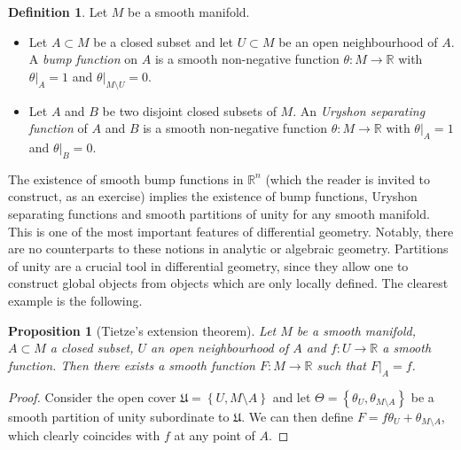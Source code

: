 \documentclass[11pt,a4paper]{book}
\newtheorem{prop}[thm]{Proposition}
\theoremstyle{remark} \newtheorem{rmk}[thm]{Remark}
\theoremstyle{definition} \newtheorem{defn}[thm]{Definition}
\theoremstyle{definition} \newtheorem{ex}[thm]{Example}
\theoremstyle{definition} \newtheorem{ej}[thm]{Exercise}
\begin{document}
\begin{defn}
  Let $M$ be a smooth manifold.
  \begin{itemize}
    \item Let $A\subset M$ be a closed subset and let $U\subset M$ be an open neighbourhood of $A$. A \emph{bump function} on $A$ is a smooth non-negative function $\theta:M\rightarrow \mathbb{R}$ with $\theta|_A = 1$ and $\theta|_{M\setminus U} = 0$.
          \item Let $A$ and $B$ be two disjoint closed subsets of $M$. An \emph{Uryshon separating function} of $A$ and $B$ is a smooth non-negative function $\theta:M\rightarrow \mathbb{R}$ with $\theta|_A=1$ and $\theta|_B = 0$.
  \end{itemize}
\end{defn}

The existence of smooth bump functions in $\mathbb{R}^n$ (which the reader is invited to construct, as an exercise) implies the existence of bump functions, Uryshon separating functions and smooth partitions of unity for any smooth manifold. This is one of the most important features of differential geometry. Notably, there are no counterparts to these notions in analytic or algebraic geometry. Partitions of unity are a crucial tool in differential geometry, since they allow one to construct global objects from objects which are only locally defined. The clearest example is the following.

\begin{prop}[Tietze's extension theorem]
Let $M$ be a smooth manifold, $A\subset M$ a closed subset, $U$ an open neighbourhood of $A$ and $f:U\rightarrow \mathbb{R}$ a smooth function. Then there exists a smooth function $F:M\rightarrow \mathbb{R}$ such that $F|_A = f$.
\end{prop}

\begin{proof}
Consider the open cover $\mathfrak{U}=\left\{ U, M\setminus A \right\}$ and let $\Theta=\left\{ \theta_U,\theta_{M\setminus A} \right\}$ be a smooth partition of unity subordinate to $\mathfrak{U}$. We can then define $F=f \theta_U + \theta_{M \setminus A}$, which clearly coincides with $f$ at any point of $A$.
\end{proof}
%
%
%
\end{document}
